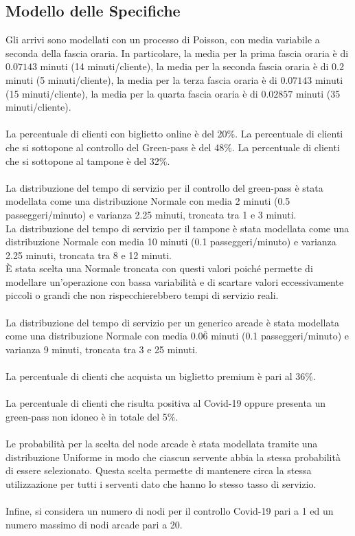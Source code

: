 \documentclass{article}
\begin{document}
\subsection{Modello delle Specifiche}
Gli arrivi sono modellati con un processo di Poisson, con media variabile a seconda della fascia oraria. In particolare, la media per la prima fascia oraria è di $0.07143$  minuti (14 minuti/cliente), la media per la seconda fascia oraria è di $0.2$  minuti (5 minuti/cliente), la media per la terza fascia oraria è di $0.07143$   minuti (15 minuti/cliente), la media per la quarta fascia oraria è di $0.02857$  minuti (35 minuti/cliente).
\\ \\
La percentuale di clienti con biglietto online è del 20\%. La percentuale di clienti che si sottopone al controllo del  Green-pass è del 48\%. La percentuale di clienti che si sottopone al tampone è del 32\%.
\\ \\
La distribuzione del tempo di servizio per il controllo del green-pass è stata modellata
come una distribuzione Normale con media 2 minuti (0.5 passeggeri/minuto) e varianza 2.25 minuti, troncata tra 1 e 3 minuti. 
\\
La distribuzione del tempo di servizio per il tampone è stata modellata
come una distribuzione Normale con media 10 minuti (0.1 passeggeri/minuto) e varianza 2.25 minuti, troncata tra 8 e 12 minuti. 
\\
È stata scelta una Normale troncata con questi valori poiché permette di modellare un'operazione con bassa variabilità e di scartare valori eccessivamente piccoli o grandi che non rispecchierebbero tempi di servizio reali.
\\ \\
La distribuzione del tempo di servizio per un generico arcade è stata modellata
come una distribuzione Normale con media $0.0\overline{6}$ minuti (0.1 passeggeri/minuto) e varianza 9 minuti, troncata tra 3 e 25 minuti.
\\ \\
La percentuale di clienti che acquista un biglietto premium è pari al 36\%.
\\ \\
La percentuale di clienti che risulta positiva al Covid-19 oppure presenta un green-pass non idoneo è in totale del 5\%.
\\ \\
Le probabilità per la scelta del node arcade è stata modellata tramite una distribuzione Uniforme in modo che ciascun servente abbia la stessa probabilità di essere selezionato. Questa scelta permette di mantenere circa la stessa utilizzazione per tutti i serventi dato che hanno lo stesso tasso di servizio.
\\ \\
Infine, si considera un numero di nodi per il controllo Covid-19 pari a 1 ed un numero massimo di nodi arcade pari a 20.
\end{document}
